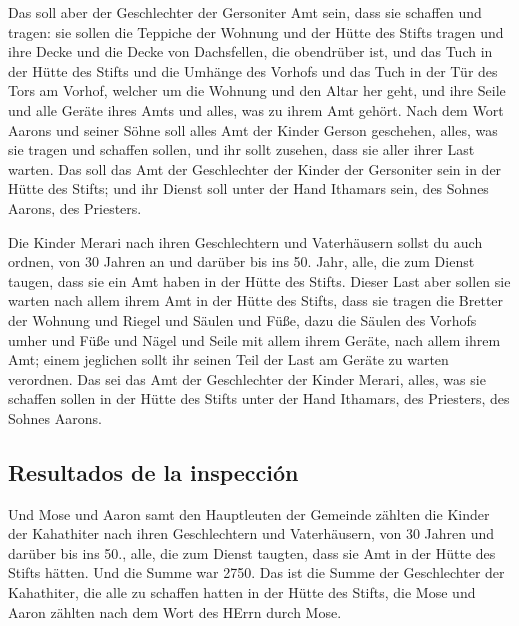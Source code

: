 Das soll aber der Geschlechter der Gersoniter Amt sein,
dass sie schaffen und tragen:  sie sollen die Teppiche
der Wohnung und der Hütte des Stifts tragen und ihre Decke und die Decke
von Dachsfellen, die obendrüber ist, und das Tuch in der Hütte des
Stifts  und die Umhänge des Vorhofs und das Tuch in der
Tür des Tors am Vorhof, welcher um die Wohnung und den Altar her geht,
und ihre Seile und alle Geräte ihres Amts und alles, was zu ihrem Amt
gehört.  Nach dem Wort Aarons und seiner Söhne soll alles
Amt der Kinder Gerson geschehen, alles, was sie tragen und schaffen
sollen, und ihr sollt zusehen, dass sie aller ihrer Last warten.
 Das soll das Amt der Geschlechter der Kinder der
Gersoniter sein in der Hütte des Stifts; und ihr Dienst soll unter der
Hand Ithamars sein, des Sohnes Aarons, des Priesters.

 Die Kinder Merari nach ihren Geschlechtern und
Vaterhäusern sollst du auch ordnen,  von 30 Jahren an und
darüber bis ins 50. Jahr, alle, die zum Dienst taugen, dass sie ein Amt
haben in der Hütte des Stifts.  Dieser Last aber sollen
sie warten nach allem ihrem Amt in der Hütte des Stifts, dass sie tragen
die Bretter der Wohnung und Riegel und Säulen und Füße, 
dazu die Säulen des Vorhofs umher und Füße und Nägel und Seile mit allem
ihrem Geräte, nach allem ihrem Amt; einem jeglichen sollt ihr seinen
Teil der Last am Geräte zu warten verordnen.  Das sei das
Amt der Geschlechter der Kinder Merari, alles, was sie schaffen sollen
in der Hütte des Stifts unter der Hand Ithamars, des Priesters, des
Sohnes Aarons.

\hypertarget{resultados-de-la-inspecciuxf3n}{%
\subsection{Resultados de la
inspección}\label{resultados-de-la-inspecciuxf3n}}

 Und Mose und Aaron samt den Hauptleuten der Gemeinde
zählten die Kinder der Kahathiter nach ihren Geschlechtern und
Vaterhäusern,  von 30 Jahren und darüber bis ins 50.,
alle, die zum Dienst taugten, dass sie Amt in der Hütte des Stifts
hätten.  Und die Summe war 2750.  Das ist
die Summe der Geschlechter der Kahathiter, die alle zu schaffen hatten
in der Hütte des Stifts, die Mose und Aaron zählten nach dem Wort des
HErrn durch Mose.

